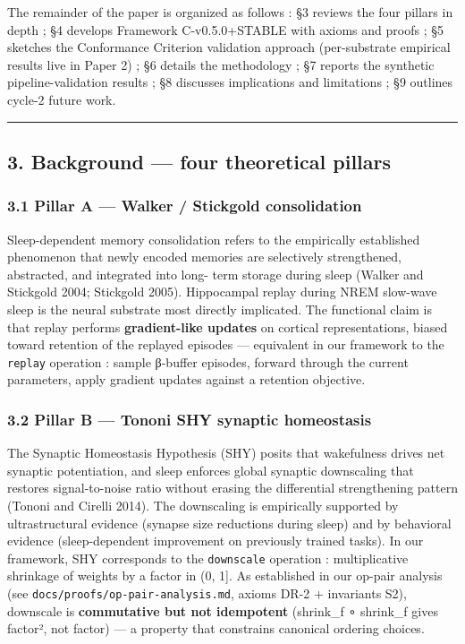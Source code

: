 \documentclass[
]{article}
\begin{document}
The remainder of the paper is organized as follows : §3 reviews the four
pillars in depth ; §4 develops Framework C-v0.5.0+STABLE with axioms and
proofs ; §5 sketches the Conformance Criterion validation approach
(per-substrate empirical results live in Paper 2) ; §6 details the
methodology ; §7 reports the synthetic pipeline-validation results ; §8
discusses implications and limitations ; §9 outlines cycle-2 future
work.

\begin{center}\rule{0.5\linewidth}{0.5pt}\end{center}

\subsection{3. Background --- four theoretical
pillars}\label{background-four-theoretical-pillars}

\subsubsection{3.1 Pillar A --- Walker / Stickgold
consolidation}\label{pillar-a-walker-stickgold-consolidation}

Sleep-dependent memory consolidation refers to the empirically
established phenomenon that newly encoded memories are selectively
strengthened, abstracted, and integrated into long- term storage during
sleep (Walker and Stickgold 2004; Stickgold 2005). Hippocampal replay
during NREM slow-wave sleep is the neural substrate most directly
implicated. The functional claim is that replay performs
\textbf{gradient-like updates} on cortical representations, biased
toward retention of the replayed episodes --- equivalent in our
framework to the \texttt{replay} operation : sample β-buffer episodes,
forward through the current parameters, apply gradient updates against a
retention objective.

\subsubsection{3.2 Pillar B --- Tononi SHY synaptic
homeostasis}\label{pillar-b-tononi-shy-synaptic-homeostasis}

The Synaptic Homeostasis Hypothesis (SHY) posits that wakefulness drives
net synaptic potentiation, and sleep enforces global synaptic
downscaling that restores signal-to-noise ratio without erasing the
differential strengthening pattern (Tononi and Cirelli 2014). The
downscaling is empirically supported by ultrastructural evidence
(synapse size reductions during sleep) and by behavioral evidence
(sleep-dependent improvement on previously trained tasks). In our
framework, SHY corresponds to the \texttt{downscale} operation :
multiplicative shrinkage of weights by a factor in (0, 1{]}. As
established in our op-pair analysis (see
\texttt{docs/proofs/op-pair-analysis.md}, axioms DR-2 + invariants S2),
downscale is \textbf{commutative but not idempotent} (shrink\_f ∘
shrink\_f gives factor², not factor) --- a property that constrains
canonical ordering choices.
\end{document}
